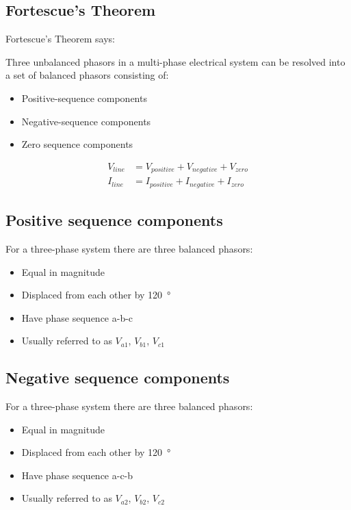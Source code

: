 \subsection{Fortescue's Theorem}
Fortescue's Theorem says:
\begin{quoting}
	Three unbalanced phasors in a multi-phase electrical system can be resolved into a set of balanced phasors consisting of:
\end{quoting}
\begin{itemize}
	\item Positive-sequence components
	\item Negative-sequence components
	\item Zero sequence components
\end{itemize}
\begin{align}
	V_{line} & = V_{positive} + V_{negative} + V_{zero} \\
	I_{line} & = I_{positive} + I_{negative} + I_{zero}
\end{align}
\subsection{Positive sequence components}
For a three-phase system there are three balanced phasors:
\begin{itemize}
	\item Equal in magnitude
	\item Displaced from each other by \SI{120}{\degree}
	\item Have phase sequence a-b-c
	\item Usually referred to as $V_{a1}$, $V_{b1}$, $V_{c1}$
\end{itemize}
\subsection{Negative sequence components}
For a three-phase system there are three balanced phasors:
\begin{itemize}
	\item Equal in magnitude
	\item Displaced from each other by \SI{120}{\degree}
	\item Have phase sequence a-c-b
	\item Usually referred to as $V_{a2}$, $V_{b2}$, $V_{c2}$
\end{itemize}
